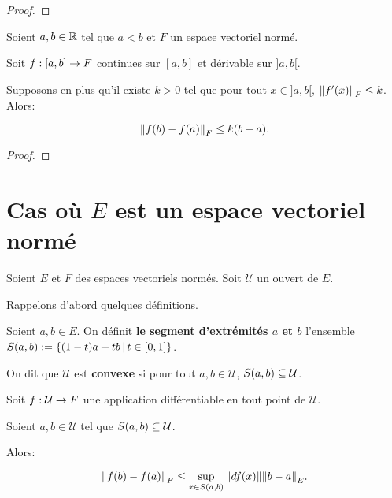 \ifdefined\outputproof
\begin{proof}

\end{proof}
\fi

\begin{corollary}
	Soient $a, b \in \mathbb{R}$ tel que $a < b$ et $F$ un espace vectoriel normé.

	Soit $f : [a, b] \rightarrow F$ continues sur $[a, b]$ et dérivable sur
	$]a, b[$.

	Supposons en plus qu'il existe $k > 0$ tel que pour tout $x \in ]a, b[$,
	$\norm{f'(x)}_{F} \leq k$. Alors:

	\begin{equation*}
		\norm{f(b) - f(a)}_{F} \leq k (b - a).
	\end{equation*}
\end{corollary}

\ifdefined\outputproof
\begin{proof}

\end{proof}
\fi

\section{Cas où $E$ est un espace vectoriel normé}

Soient $E$ et $F$ des espaces vectoriels normés.
Soit $\mathcal{U}$ un ouvert de $E$.

Rappelons d'abord quelques définitions.

\begin{definition}
	Soient $a, b \in E$. On définit \textbf{le segment d'extrémités $a$ et $b$}
	l'ensemble $S(a, b) := \left\{(1 - t) a + t b \, | \, t \in [0, 1] \right\}$.
\end{definition}

\begin{definition}
	On dit que $\mathcal{U}$ est \textbf{convexe} si pour tout $a, b \in
	\mathcal{U}$, $S(a, b) \subseteq \mathcal{U}$.
\end{definition}

\begin{theorem} 
	Soit $f : \mathcal{U} \rightarrow F$ une application différentiable en tout
	point de $\mathcal{U}$.

	Soient $a, b \in \mathcal{U}$ tel que $S(a, b) \subseteq \mathcal{U}$.

	Alors:

	\begin{equation*}
		\norm{f(b) - f(a)}_{F} \leq \displaystyle \sup_{x \in S(a, b)}
		\norm{df(x)} \norm{b - a}_{E}.
	\end{equation*}

	\label{theorem:mean_value_theorem}
\end{theorem}

